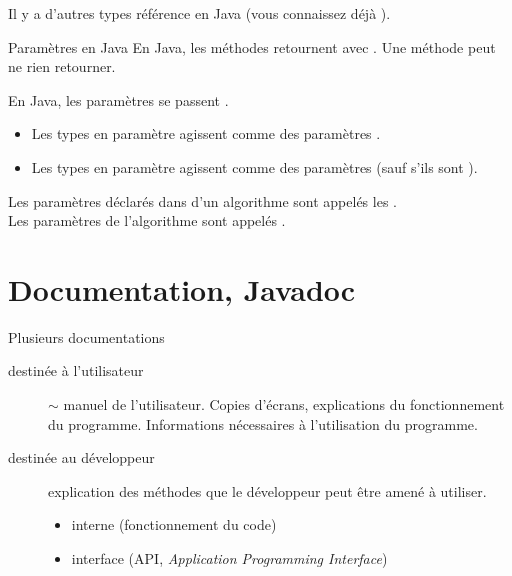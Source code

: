 \begin{hideedit}
\begin{frame}[fragile]
  \pause
  Il y a d'autres types référence en Java (vous connaissez déjà ).
\end{frame}

\begin{frame}{Paramètres en Java}
  En Java, les méthodes retournent avec . Une
  méthode peut ne rien retourner.

  En Java, les paramètres se passent .
  \begin{itemize}
    \item Les types  en paramètre agissent comme des
      paramètres .
    \item Les types  en paramètre agissent comme des
      paramètres  (sauf s'ils sont ).
  \end{itemize}
\end{frame}

\begin{frame}
  \begin{definition}
    Les paramètres déclarés dans  d'un algorithme sont
    appelés les .\\
    Les paramètres  de l'algorithme sont appelés
    .
  \end{definition}
\end{frame}

\section[Documentation]{Documentation, Javadoc}
\frame{\sectionpage}

\begin{frame}{Plusieurs documentations}
\begin{description}
  \item[destinée à l'utilisateur] \(\sim\) manuel de l'utilisateur. Copies
    d'écrans, explications du fonctionnement du programme. Informations
    nécessaires à l'utilisation du programme.
  \item[destinée au développeur] explication des méthodes que le
    développeur peut être amené à utiliser.
    \pause
    \begin{itemize}[<+->]
      \item interne (fonctionnement du code)
      \item interface (API, \textit{Application Programming Interface})
    \end{itemize}
\end{description}
\end{frame}


\end{hideedit}
